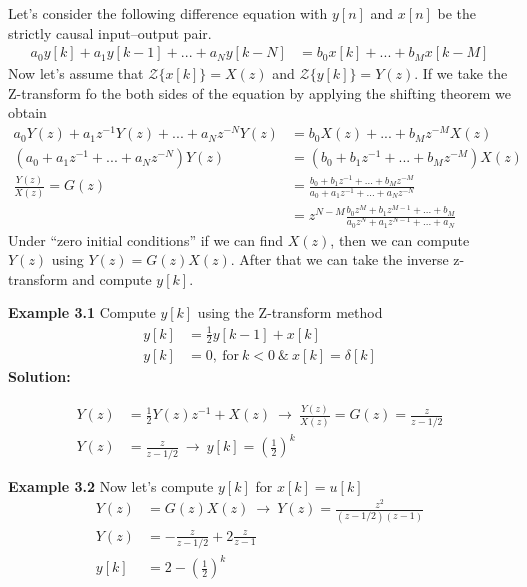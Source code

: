 \documentclass[twoside]{article}
\begin{document}
Let's consider the following difference equation with $y[n]$
and $x[n]$ be the strictly causal input--output pair.
%
\begin{align*}
a_0  y[k] + a_{1}  y[k-1] + ... + a_N y[k-N] &= b_{0}  x[k] + ... +
                                               b_M x[k-M] 
\end{align*}
%
Now let's assume that $\mathcal{Z}\lbrace x[k] \rbrace = X(z)$ and
$\mathcal{Z}\lbrace y[k] \rbrace = Y(z)$. If we take the Z-transform
fo the both sides of the equation by applying the shifting theorem 
we obtain
%
\begin{align*}
a_0 Y(z) + a_{1} z^{-1}  Y(z) + ... + a_N z^{-N} Y(z) &= 
b_{0}  X(z) + ... + b_M z^{-M} X(z)
\\
( a_0 + a_{1} z^{-1} + ... + a_N z^{-N} ) Y(z) &= 
( b_0 + b_{1} z^{-1} + ... + b_M z^{-M} ) X(z)
\\
\frac{Y(z)}{X(z)} = G(z) &= 
\frac{b_0 + b_{1} z^{-1} + ... + b_M z^{-M}}{a_0 + a_{1} z^{-1} + ... + a_N z^{-N}}
\\ &= 
z^{N-M} 
\frac{b_0 z^{M} + b_{1} z^{M-1} + ... + b_M}{a_0 z^{N} + a_{1} z^{N-1} + ... + a_N}
\end{align*}
%
Under ``zero initial conditions'' if we can find $X(z)$, then we can
compute $Y(z)$ using $Y(z) = G(z) X(z)$. After that we can take the inverse z-transform 
and compute $y[k]$.

\textbf{Example 3.1} Compute $y[k]$ using the Z-transform method
%
\begin{align*}
y[k] &= \frac{1}{2} y[k-1] + x[k]  \\
y[k] &= 0 , \ \mathrm{for} \ k < 0  \ \& \ x[k] = \delta[k]
\end{align*}
%
\textbf{Solution:}

\begin{align*}
Y(z) &= \frac{1}{2} Y(z)z^{-1} + X(z) \  \rightarrow \
       \frac{Y(z)}{X(z)} = G(z) = \frac{z}{z - 1/2}  \\
Y(z) &= \frac{z}{z - 1/2} \ \rightarrow \ y[k] = \left( \frac{1}{2} \right)^k
\end{align*}

\textbf{Example 3.2} Now let's compute $y[k]$ for $x[k] = u[k]$
%
\begin{align*}
Y(z) &= G(z)  X(z) \  \rightarrow \ Y(z) = \frac{z^2}{(z - 1/2)(z-1)}
\\
Y(z) &= - \frac{z}{z - 1/2} + 2\frac{z}{z - 1}
\\
y[k] &= 2 - \left( \frac{1}{2} \right)^k
\end{align*}
\end{document}
